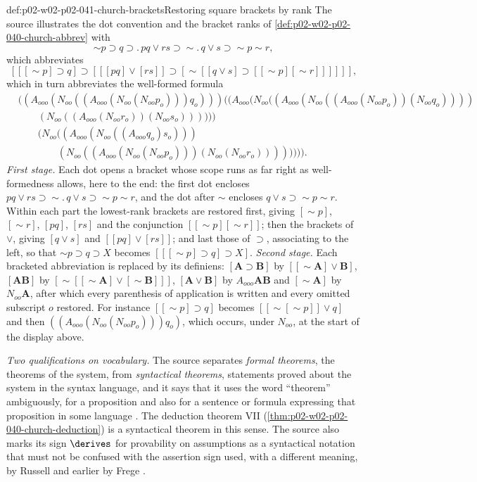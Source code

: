 \begin{hbexample}{def:p02-w02-p02-041-church-brackets}{Restoring square brackets by rank}
The source illustrates the dot convention and the bracket ranks of
\cref{def:p02-w02-p02-040-church-abbrev} with
\cite[\S2, p.~59]{Church1940}
\[
 \sim p\supset q\supset.\,pq\vee rs\supset\sim.\,q\vee s\supset\sim p\sim r,
\]
which abbreviates
\[
 [[[\sim p]\supset q]\supset[[[pq]\vee[rs]]\supset[\sim[[q\vee s]\supset[[\sim p][\sim r]]]]]],
\]
which in turn abbreviates the well-formed formula
\[
\begin{aligned}
 &((A_{ooo}(N_{oo}((A_{ooo}(N_{oo}(N_{oo}p_o)))q_o)))((A_{ooo}(N_{oo}((A_{ooo}(N_{oo}((A_{ooo}(N_{oo}p_o))(N_{oo}q_o))))\\
 &\qquad(N_{oo}((A_{ooo}(N_{oo}r_o))(N_{oo}s_o))))))\\
 &\qquad(N_{oo}((A_{ooo}(N_{oo}((A_{ooo}q_o)s_o)))\\
 &\qquad\qquad(N_{oo}((A_{ooo}(N_{oo}(N_{oo}p_o)))(N_{oo}(N_{oo}r_o)))))))).
\end{aligned}
\]
\emph{First stage.}  Each dot opens a bracket whose scope runs as far right as
well-formedness allows, here to the end: the first dot encloses
\(pq\vee rs\supset\sim.\,q\vee s\supset\sim p\sim r\), and the dot after
\(\sim\) encloses \(q\vee s\supset\sim p\sim r\).  Within each part the
lowest-rank brackets are restored first, giving \([\sim p]\), \([\sim r]\),
\([pq]\), \([rs]\) and the conjunction \([[\sim p][\sim r]]\); then the
brackets of \(\vee\), giving \([q\vee s]\) and \([[pq]\vee[rs]]\); and last
those of \(\supset\), associating to the left, so that
\(\sim p\supset q\supset X\) becomes \([[[\sim p]\supset q]\supset X]\).
\emph{Second stage.}  Each bracketed abbreviation is replaced by its definiens:
\([\mathbf A\supset\mathbf B]\) by \([[\sim\mathbf A]\vee\mathbf B]\),
\([\mathbf A\mathbf B]\) by \([\sim[[\sim\mathbf A]\vee[\sim\mathbf B]]]\),
\([\mathbf A\vee\mathbf B]\) by \(A_{ooo}\mathbf A\mathbf B\) and
\([\sim\mathbf A]\) by \(N_{oo}\mathbf A\), after which every parenthesis of
application is written and every omitted subscript \(o\) restored.  For
instance \([[\sim p]\supset q]\) becomes \([[\sim[\sim p]]\vee q]\) and then
\(((A_{ooo}(N_{oo}(N_{oo}p_o)))q_o)\), which occurs, under \(N_{oo}\), at the start of the display above.
\end{hbexample}

\emph{Two qualifications on vocabulary.}  The source separates \emph{formal
theorems}, the theorems of the system, from \emph{syntactical theorems},
statements proved about the system in the syntax language, and it says that
it uses the word ``theorem'' ambiguously, for a proposition and also for a
sentence or formula expressing that proposition in some language
\cite[\S4, p.~61]{Church1940}.  The deduction theorem VII
(\cref{thm:p02-w02-p02-040-church-deduction}) is a syntactical theorem in this
sense.  The source also marks its sign \(\derives\) for provability on
assumptions as a syntactical notation that must not be confused with the
assertion sign used, with a different meaning, by Russell and earlier by Frege
\cite[\S5, p.~62]{Church1940}.


